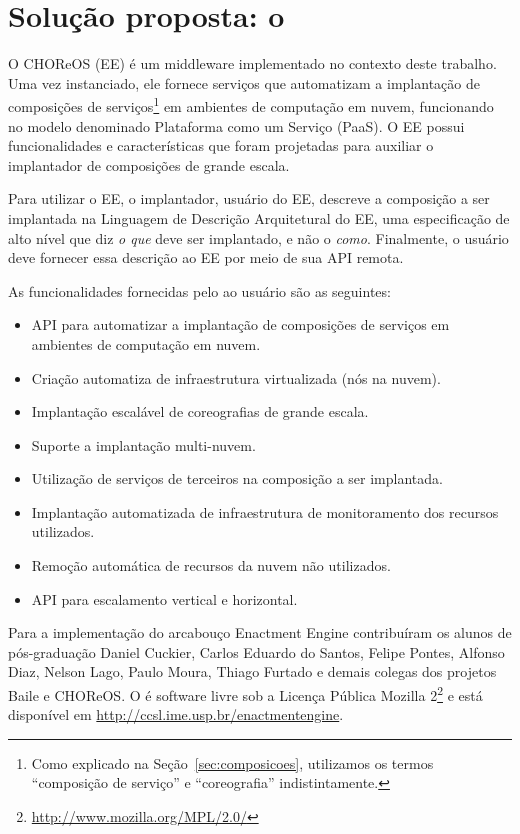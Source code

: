 \chapter{Solução proposta: o \ee}
\label{cap:solucao}

O CHOReOS \ee (EE) é um middleware implementado no contexto deste trabalho.
Uma vez instanciado, ele fornece serviços que automatizam
a implantação de composições de serviços\footnote{Como explicado na Seção~\ref{sec:composicoes}, utilizamos os termos 
``composição de serviço'' e ``coreografia'' indistintamente.} 
em ambientes de computação em nuvem,
funcionando no modelo denominado Plataforma como um Serviço (PaaS).
O EE possui funcionalidades e características que foram projetadas para auxiliar o
implantador de composições de grande escala.

Para utilizar o EE, o implantador, usuário do EE, descreve a composição a ser implantada
na Linguagem de Descrição Arquitetural do EE, uma especificação de alto nível que
diz \emph{o que} deve ser implantado, e não o \emph{como}. 
Finalmente, o usuário deve fornecer essa descrição ao EE por meio de sua API remota.

As funcionalidades fornecidas pelo \ee ao usuário são as seguintes:

\begin{itemize}
\item API para automatizar a implantação de composições de serviços em ambientes de computação em nuvem.
\item Criação automatiza de infraestrutura virtualizada (nós na nuvem).
\item Implantação escalável de coreografias de grande escala.
\item Suporte a implantação multi-nuvem.
\item Utilização de serviços de terceiros na composição a ser implantada.
\item Implantação automatizada de infraestrutura de monitoramento dos recursos utilizados.
\item Remoção automática de recursos da nuvem não utilizados.
\item API para escalamento vertical e horizontal.
\end{itemize}

Para a implementação do arcabouço Enactment Engine contribuíram os alunos de pós-graduação Daniel Cuckier, Carlos Eduardo do Santos, Felipe Pontes, Alfonso Diaz, Nelson Lago, Paulo Moura, Thiago Furtado e demais colegas dos projetos Baile e CHOReOS. O \ee é software livre 
sob a Licença Pública Mozilla 2\footnote{\url{http://www.mozilla.org/MPL/2.0/}} 
e está disponível em \url{http://ccsl.ime.usp.br/enactmentengine}. 


